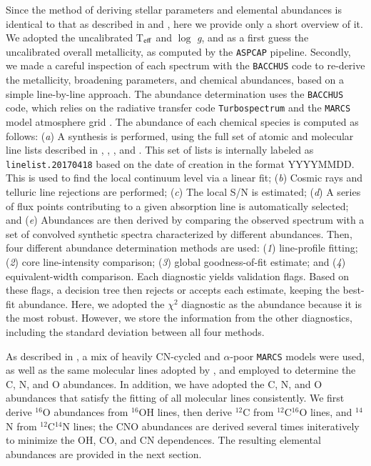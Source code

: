 \documentclass[longauth]{aa} %
\begin{document}
Since the method of deriving stellar parameters and elemental abundances is identical to that as described in \citet{FT_Chemodynamics} and  \citet{FT_Subpopulation}, here we provide only a short overview of it. We adopted the uncalibrated T$_{\rm eff}$ and $\log$ \textit{g}, and as a first guess the uncalibrated overall metallicity, as computed by the \texttt{ASPCAP} pipeline. Secondly, we made a careful inspection of each spectrum with the \texttt{BACCHUS} code to re-derive the metallicity, broadening parameters, and chemical abundances, based on a simple line-by-line approach. The abundance determination uses the \texttt{BACCHUS} code, which relies on the radiative transfer code \texttt{Turbospectrum} \citep{Alvarez1998, Plez2012} and the \texttt{MARCS} model atmosphere grid \citep{Gustafsson2008}. The abundance of each chemical species is computed as follows: (\textit{a}) A synthesis is performed, using the full set of atomic and molecular line lists described in \citet{Shetrone2015}, \citet{Hasselquist2016}, \citet{Cunha2017}, and \citet{Smith2021}. This set of lists is internally labeled as \texttt{linelist.20170418} based on the date of creation in the format YYYYMMDD. This is used to find the local continuum level via a linear fit; (\textit{b}) Cosmic rays and telluric line rejections are performed; (\textit{c}) The local S/N is estimated; (\textit{d}) A series of flux points contributing to a given absorption line is automatically selected; and (\textit{e}) Abundances are then derived by comparing the observed spectrum with a set of convolved synthetic spectra characterized by different abundances. Then, four different abundance determination methods are used: (\textit{1}) line-profile fitting; (\textit{2}) core line-intensity comparison; (\textit{3}) global goodness-of-fit estimate; and (\textit{4}) equivalent-width comparison. Each diagnostic yields validation flags. Based on these flags, a decision tree then rejects or accepts each estimate, keeping the best-fit abundance. Here, we adopted the $\chi^2$ diagnostic as the abundance because it is the most robust. However, we store the information from the other diagnostics, including the standard deviation between all four methods.

As described in \citet{FT_Chemodynamics}, a mix of heavily CN-cycled and $\alpha$-poor \texttt{MARCS} models were used, as well as the same molecular lines adopted by \citep{Smith2013}, and employed to determine the C, N, and O abundances.  In addition, we have adopted the C, N, and O abundances that satisfy the fitting of all molecular lines consistently. We first derive $^{16}$O abundances from $^{16}$OH lines, then derive $^{12}$C from $^{12}$C$^{16}$O lines, and $^{14}$N from $^{12}$C$^{14}$N lines; the CNO abundances are derived several times initeratively to minimize the OH, CO, and CN dependences. The resulting elemental abundances are provided in the next section. 
\end{document}

